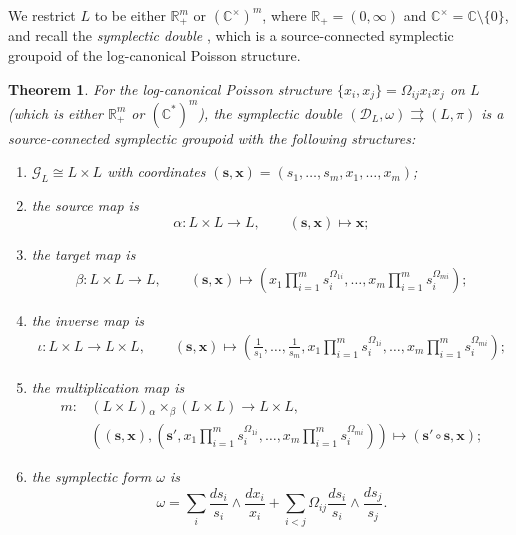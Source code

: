 \documentclass{amsart}
\newtheorem{theorem}{Theorem}[section]
\numberwithin{equation}{section}
\newcommand{\bfs}{\mathbf{s}}
\newcommand{\bfx}{\mathbf{x}}
\newcommand{\cG}{\mathcal{G}}
\newcommand{\cD}{\mathcal{D}}
\newcommand{\CC}{\mathbb{C}}
\newcommand{\RR}{\mathbb{R}}
\newcommand{\rra}{\rightrightarrows}
\begin{document}
We restrict $L$ to be either $\RR_+^m$ or $(\CC^\times)^m$, where $\RR_+ = (0, \infty)$ and $\CC^\times = \CC \setminus \{0\}$, and recall the \emph{symplectic double} \cite{MR2470108}, which is a source-connected symplectic groupoid of the log-canonical Poisson structure.
\begin{theorem} 
  \cite{MR2470108}
  For the log-canonical Poisson structure $\{x_i, x_j\} = \Omega_{ij} x_i x_j$ on $L$ (which is either $\RR_+^m$ or $(\CC^*)^m$),
  the symplectic double $(\cD_L, \omega) \rra (L, \pi)$ is a source-connected symplectic groupoid with the following structures:
  \begin{enumerate}
    \item $\cG_L \cong L \times L$ with coordinates $(\bfs, \bfx) = (s_1, \ldots, s_m, x_1, \ldots, x_m)$;
    \item the source map is
      \[\alpha: L \times L \to L, \qquad (\bfs, \bfx) \mapsto \bfx;\]
    \item the target map is
      \[\begin{aligned}
	  \beta: L \times L \to L, \qquad (\bfs, \bfx) \mapsto \left(x_1 \prod_{i=1}^m s_i^{\Omega_{1i}}, \ldots, x_m \prod_{i=1}^m s_i^{\Omega_{mi}}\right);
        \end{aligned}\]
    \item the inverse map is
      \[\begin{aligned}
	  \iota: L \times L \to L \times L, \qquad (\bfs, \bfx) \mapsto \left(\frac{1}{s_1}, \ldots, \frac{1}{s_m}, x_1 \prod_{i=1}^m s_i^{\Omega_{1i}}, \ldots, x_m \prod_{i=1}^m s_i^{\Omega_{mi}}\right);
        \end{aligned}\]
    \item the multiplication map is
      \[\begin{aligned}
	  m: & \left(L \times L\right) {_\alpha \times_\beta} \left(L \times L\right) \to L \times L, \\
	     & \left((\bfs, \bfx), \left(\bfs', x_1 \prod_{i=1}^m s_i^{\Omega_{1i}}, \ldots, x_m \prod_{i=1}^m s_i^{\Omega_{mi}}\right)\right) \mapsto (\bfs' \circ \bfs, \bfx );
        \end{aligned}\]
    \item the symplectic form $\omega$ is
      \begin{equation} \label{eq:2-formG_X}
		\omega = \sum_{i} \frac{d s_i}{s_i} \wedge \frac{d x_i}{x_i} + \sum_{i < j} \Omega_{ij} \frac{d s_i}{s_i} \wedge \frac{d s_j}{s_j}.
	\end{equation}
  \end{enumerate}
\end{theorem}
\end{document}
